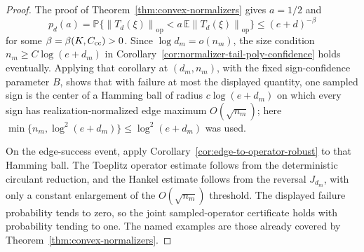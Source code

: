 \documentclass[11pt]{amsart}
\numberwithin{equation}{section}
\theoremstyle{definition}
\theoremstyle{remark}
\newcommand{\op}{\mathrm{op}}
\newcommand{\Prob}{\mathbb P}
\newcommand{\Exp}{\mathbb E}
\newcommand{\norm}[1]{\left\lVert #1\right\rVert}
\begin{document}
\begin{proof}
The proof of Theorem~\ref{thm:convex-normalizers} gives \(a=1/2\) and
\[
  p_d(a)=\Prob\{\norm{T_d(\xi)}_{\op}<a\,\Exp\norm{T_d(\xi)}_{\op}\}
  \le (e+d)^{-\beta}
\]
for some \(\beta=\beta(K,C_{\rm cc})>0\).  Since
\(\log d_m=o(n_m)\), the size condition \(n_m\ge C\log(e+d_m)\) in
Corollary~\ref{cor:normalizer-tail-poly-confidence} holds eventually.  Applying
that corollary at \((d_m,n_m)\), with the fixed sign-confidence parameter \(B\),
shows that with failure at most the displayed quantity, one sampled sign is the
center of a Hamming ball of radius \(c\log(e+d_m)\) on which every sign has
realization-normalized edge maximum \(O(\sqrt{n_m})\); here
\(\min\{n_m,\log^2(e+d_m)\}\le \log^2(e+d_m)\) was used.

On the edge-success event, apply
Corollary~\ref{cor:edge-to-operator-robust} to that Hamming ball.  The
Toeplitz operator estimate follows from the deterministic circulant reduction,
and the Hankel estimate follows from the reversal \(J_{d_m}\), with only a
constant enlargement of the \(O(\sqrt{n_m})\) threshold.  The displayed failure
probability tends to zero, so the joint sampled-operator certificate holds with
probability tending to one.  The named examples are those already covered by
Theorem~\ref{thm:convex-normalizers}.
\end{proof}
\end{document}
